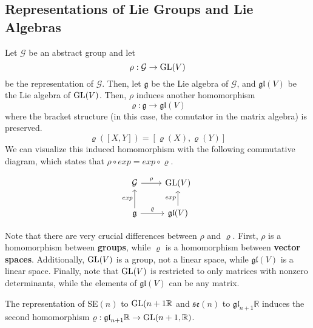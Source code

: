 \subsection{Representations of Lie Groups and Lie Algebras}

  Let $\mathcal{G}$ be an abstract group and let
  \begin{equation}
    \rho: \mathcal{G} \rightarrow \GL(V)
  \end{equation}
  be the representation of $\mathcal{G}$. Then, let $\mathfrak{g}$ be the Lie algebra of $\mathcal{G}$, and $\mathfrak{gl}(V)$ be the Lie algebra of $\GL(V)$. Then, $\rho$ induces another homomorphism 
  \begin{equation}
    \varrho: \mathfrak{g} \rightarrow \mathfrak{gl}(V)
  \end{equation}
  where the bracket structure (in this case, the comutator in the matrix algebra) is preserved. 
  \begin{equation}
    \varrho([X,Y]) = [\varrho(X), \varrho(Y)]
  \end{equation}
  We can visualize this induced homomorphism with the following commutative diagram, which states that $\rho \circ exp = exp \circ \varrho$. 

  \[\begin{tikzcd}
  \mathcal{G} \arrow{r}{\rho} & \GL(V)\\
  \mathfrak{g} \arrow{u}{exp} \arrow{r}{\varrho} & \mathfrak{gl}(V) \arrow{u}{exp}
  \end{tikzcd}\]

  Note that there are very crucial differences between $\rho$ and $\varrho$. First, $\rho$ is a homomorphism between \textbf{groups}, while $\varrho$ is a homomorphism between \textbf{vector spaces}. Additionally, $\GL(V)$ is a group, not a linear space, while $\mathfrak{gl}(V)$ is a linear space. Finally, note that $\GL(V)$ is restricted to only matrices with nonzero determinants, while the elements of $\mathfrak{gl}(V)$ can be any matrix. 

  \begin{example}
    The representation of SE$(n)$ to $\GL(n+1 \mathbb{R}$ and $\mathfrak{se}(n)$ to $\mathfrak{gl}_{n+1} \mathbb{R}$ induces the second homomorphism $\varrho: \mathfrak{gl}_{n+1} \mathbb{R} \rightarrow \GL(n+1, \mathbb{R})$. 
  \end{example}

